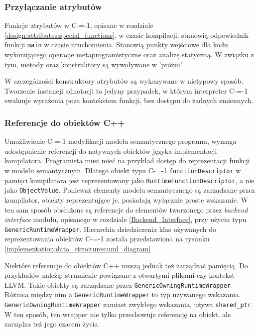 
\subsubsection{Przyłączanie atrybutów}
\label{implementation:interpreter:attribute_attachment}

Funkcje atrybutów w C-=-1, opisane w rozdziale \ref{design:attributes:special_functions}, w czasie kompilacji, stanowią odpowiednik funkcji \lstinline{main} w czasie uruchomienia.
Stanowią punkty wejściowe dla kodu wykonującego operacje metaprogramistyczne oraz analizę statyczną.
W związku z tym, metody oraz konstruktory są wywoływane w 'próżni'.

W szczególności konstruktory atrybutów są wykonywane w nietypowy sposób.
Tworzenie instancji adnotacji to jedyny przypadek, w którym interpreter C-=-1 ewaluuje wyrażenia poza kontekstem funkcji, bez dostępu do żadnych zmiennych.


\subsubsection{Referencje do obiektów C++}
\label{implementation:interpreter:cpp_object_references}

Umożliwienie C-=-1 modyfikacji modelu semantycznego programu, wymaga udostępnienie referencji do natywnych obiektów języka implementacji kompilatora. %
Programista musi mieć na przykład dostęp do reprezentacji funkcji w modelu semantycznym.
Dlatego obiekt typu C-=-1 \lstinline{functionDescriptor} w pamięci kompilatora jest reprezentowany jako \lstinline{RuntimeFunctionDescriptor}, a nie jako \lstinline{ObjectValue}.
Ponieważ elementy modelu semantycznego są zarządzane przez kompilator, obiekty reprezentujące je, posiadają wyłącznie proste wskazanie.
W ten sam sposób obsłużone są referencje do elementów tworzonego przez \emph{backend interface} modułu, opisanego w rozdziale \ref{Backend_Interface}, przy użyciu typu \lstinline{GenericRuntimeWrapper}.
Hierarchia dziedziczenia klas używanych do reprezentowania obiektów C-=-1 została przedstawiona na rysunku \ref{implementation:data_structures:uml_diagram}

Niektóre referencje do obiektów C++ muszą jednak też zarządzać pamięcią.
Do przykładów należą: strumienie powiązane z otwartymi plikami czy kontekst LLVM.
Takie obiekty są zarządzane przez \lstinline{GenericOwningRuntimeWrapper}
Różnica między nim a \lstinline{GenericRuntimeWrapper} to typ używanego wskazania.
\lstinline{GenericOwningRuntimeWrapper} zamiast zwykłego wskazania, używa \lstinline{shared_ptr}.
W ten sposób, ten wrapper nie tylko przechowuje referencję na obiekt, ale zarządza też jego czasem życia.

